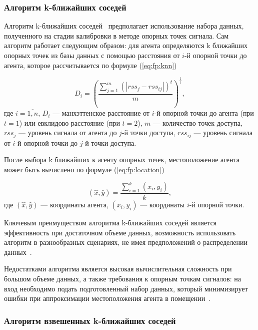 \subsubsection{Алгоритм k-ближайших соседей}

Алгоритм k-ближайших соседей~\cite{knn} предполагает использование набора данных, полученного на стадии калибровки в методе опорных точек сигнала. Сам алгоритм работает следующим образом: для агента определяются k ближайших опорных точек из базы данных с помощью расстояния от $i$-й опорной точки до агента, которое рассчитывается по формуле (\ref{eq:fp:knn})

\begin{equation}
    D_i = \left(
        \frac{\sum\limits_{j=1}^{m} (|rss_j - rss_{ij}|)^t}{m}
    \right)^{\frac{1}{t}},
    \label{eq:fp:knn}
\end{equation}
где $i = \overline{1, n}$, $D_i$ --- манхэттенское расстояние от $i$-й опорной точки до агента (при $t = 1$) или евклидово расстояние (при $t = 2$), $m$ --- количество точек доступа, $rss_j$ --- уровень сигнала от агента до $j$-й точки доступа, $rss_{ij}$ --- уровень сигнала от $i$-й опорной точки до $j$-й точки доступа.

После выбора k ближайших к агенту опорных точек, местоположение агента может быть вычислено по формуле (\ref{eq:fp:location})

\begin{equation}
    (\hat{x}, \hat{y}) = \frac{\sum\limits_{i=1}^{k}(x_i, y_i)}{k},
    \label{eq:fp:location}
\end{equation}
где $(\hat{x}, \hat{y})$ --- координаты агента, $(x_i, y_i)$ --- координаты $i$-й опорной точки.

Ключевым преимуществом алгоритма k-ближайших соседей является эффективность при достаточном объеме данных, возможность использовать алгоритм в разнообразных сценариях, не имея предположений о распределении данных~\cite{trends}.

Недостатками алгоритма является высокая вычислительная сложность при большом объеме данных, а также требования к опорным точкам сигналов: на вход необходимо подать подготовленный набор данных, который минимизирует ошибки при аппроксимации местоположения агента в помещении~\cite{android-analysis}.

\subsubsection{Алгоритм взвешенных k-ближайших соседей}

